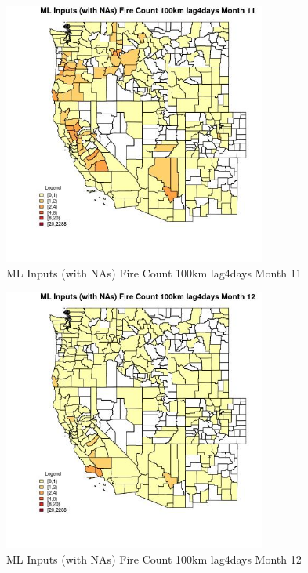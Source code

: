 \begin{figure} 
\centering  
\includegraphics[width=0.77\textwidth]{Code_Outputs/Report_ML_input_PM25_Step4_part_e_de_duplicated_aves_compiled_2019-05-20wNAs_CountyFire_Count_100km_lag4daysmedianMonth11.jpg} 
\caption{\label{fig:Report_ML_input_PM25_Step4_part_e_de_duplicated_aves_compiled_2019-05-20wNAsCountyFire_Count_100km_lag4daysmedianMonth11}ML Inputs (with NAs) Fire Count 100km lag4days Month 11} 
\end{figure} 
 

\begin{figure} 
\centering  
\includegraphics[width=0.77\textwidth]{Code_Outputs/Report_ML_input_PM25_Step4_part_e_de_duplicated_aves_compiled_2019-05-20wNAs_CountyFire_Count_100km_lag4daysmedianMonth12.jpg} 
\caption{\label{fig:Report_ML_input_PM25_Step4_part_e_de_duplicated_aves_compiled_2019-05-20wNAsCountyFire_Count_100km_lag4daysmedianMonth12}ML Inputs (with NAs) Fire Count 100km lag4days Month 12} 
\end{figure} 
 

